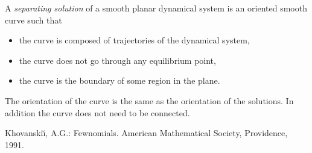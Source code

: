 \documentclass[12pt]{article}
\begin{document}

A \emph{separating solution} of a smooth planar dynamical system is an oriented smooth curve such that
\begin{itemize}
\item the curve is composed of trajectories of the dynamical system,
\item the curve does not go through any equilibrium point,
\item the curve is the boundary of some region in the plane.
\end{itemize}
The orientation of the curve is the same as the orientation of the solutions.  In addition the curve does not need to be connected.
\cite{1}
\begin{thebibliography}{1}
 Khovanski\u\i, A.G.: Fewnomials. American Mathematical Society, Providence, 1991.
\end{thebibliography}
\end{document}
